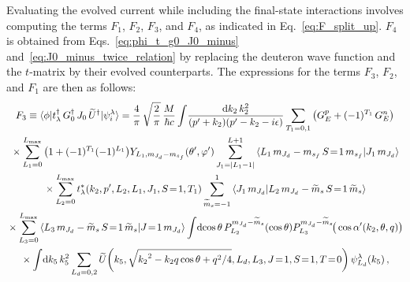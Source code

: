   Evaluating the evolved current while including the final-state interactions
  involves computing the terms $F_1$, $F_2$, $F_3$, and $F_4$, as indicated in
  Eq.~\eqref{eq:F_split_up}.  $F_4$ is obtained from
  Eqs.~\eqref{eq:phi_t_g0_J0_minus} and~\eqref{eq:J0_minus_twice_relation} by
  replacing the deuteron wave function and the $t$-matrix by their evolved
  counterparts.  The expressions for the terms $F_3$, $F_2$, and $F_1$ are then
  as follows:
  \begin{multline}
   F_3 \equiv \mbraket{\phi}{t_\lambda ^\dag \, G_0^\dag \,
   J_0 \, \widetilde{U}^\dag}{\psi_i^\lambda}
   = \frac{4}{\pi} \, \sqrt{\frac{2}{\pi}} \, \frac{M}{\hbar c}
   \int \! \frac{\dd k_2 \, k_2^2}{(\pp + k_2)(\pp - k_2 - i \epsilon)}
   \sum_{T_1 = 0,1} \big(G_E ^p + (-1)^{T_1} \,G_E^n\big) \\
   \null \times
   \sum_{L_1 = 0}^{L_{\rm max}} \big(1 + (-1)^{T_1} (-1)^{L_1}\big)
   Y_{L_1 , \mJd - \msf}(\thetacm, \phicm)
   \sum_{J_1 = |L_1 - 1|}^{L+1}
    \CG{L_1}{\mJd - \msf}{S\!=\!1}{\msf}{J_1}{\mJd} \\
    \null \times
   \sum_{L_2 = 0}^{L_{\rm max}}
    t^\ast_\lambda(k_2, \pp, L_2, L_1, J_1, S\!=\!1, T_1)
    \sum_{\widetilde{m}_s = -1}^1
    \braket{J_1 \, \mJd}{L_2 \, \mJd - \wt{m}_s \, S\!=\!1 \, \wt{m}_s} \\
    \null \times
   \sum_{L_3 = 0}^{L_{\rm max}}
    \CG{L_3}{\mJd - \widetilde{m}_s}{S\!=\!1}{\widetilde{m}_s}{J\!=\!1}{\mJd}
   \int \! \dcostheta \, P_{L_2}^{\mJd - \widetilde{m}_s}(\cos \theta)
   P_{L_3}^{\mJd - \widetilde{m}_s}\!\big(\cos \thetacprime(k_2, \theta, q)
   \big) \\
   \null \times
   \int \! \dd k_5 \, k_5^2 \sum_{L_d = 0, 2}
   \widetilde{U}\!\left(
    k_5, \sqrt{{k_2}^2 - k_2 q \cos\theta + q^2/4}, L_d, L_3, J\!=\!1, S\!=\!1,
    T\!=\!0  \right) \psi_{L_d}^\lambda (k_5) \,,
  \label{eq:F3}
  \end{multline}
